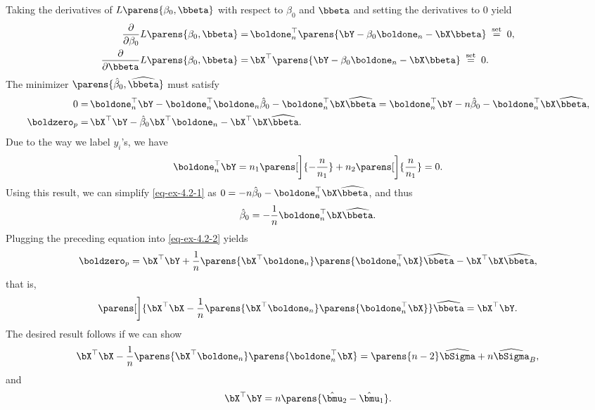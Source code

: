 \documentclass[12pt]{article}
\begin{document}
\begin{enumerate}[label=\textbf{\arabic*.}]
	Taking the derivatives of $L \parens{\beta_0, \bbeta}$ with respect to $\beta_0$ and $\bbeta$ and setting the derivatives to 0 yield 
	\begin{align*}
		\frac{\partial}{\partial \beta_0} L \parens{\beta_0, \bbeta} = & \, \boldone_{n}^\top \parens{\bY - \beta_0 \boldone_n - \bX \bbeta} \stackrel{\text{ set }}{=} 0, \\ 
		\frac{\partial}{\partial \bbeta} L \parens{\beta_0, \bbeta} = & \, \bX^\top \parens{\bY - \beta_0 \boldone_n - \bX \bbeta}\stackrel{\text{ set }}{=} 0. 
	\end{align*}
	The minimizer $\parens{\hat{\beta}_0, \widehat{\bbeta}}$ must satisfy 
	\begin{align}
		0 = & \, \boldone_n^\top \bY - \boldone_n^\top \boldone_n \hat{\beta}_0 - \boldone_n^\top \bX \widehat{\bbeta} = \boldone_n^\top \bY - n \hat{\beta}_0 - \boldone_n^\top \bX \widehat{\bbeta}, \label{eq-ex-4.2-1} \\ 
		\boldzero_p = & \, \bX^\top \bY - \hat{\beta}_0 \bX^\top \boldone_n - \bX^\top \bX \widehat{\bbeta}. \label{eq-ex-4.2-2}
	\end{align}
	Due to the way we label $y_i$'s, we have 
	\begin{align*}
		\boldone_n^\top \bY = n_1 \parens[\bigg]{- \frac{n}{n_1}} + n_2 \parens[\bigg]{\frac{n}{n_1}} = 0. 
	\end{align*}
	Using this result, we can simplify \eqref{eq-ex-4.2-1} as $0 = - n \hat{\beta}_0 - \boldone_n^\top \bX \widehat{\bbeta}$, and thus 
	\begin{align*}
		\hat{\beta}_0 = - \frac{1}{n} \boldone_n^\top \bX \widehat{\bbeta}. 
	\end{align*}
	Plugging the preceding equation into \eqref{eq-ex-4.2-2} yields 
	\begin{align*}
		\boldzero_p = \bX^\top \bY + \frac{1}{n} \parens{ \bX^\top \boldone_n } \parens{ \boldone_n^\top \bX } \widehat{\bbeta} - \bX^\top \bX \widehat{\bbeta}, 
	\end{align*}
	that is, 
	\begin{align*}
		\parens[\bigg]{\bX^\top \bX - \frac{1}{n} \parens{ \bX^\top \boldone_n } \parens{ \boldone_n^\top \bX } } \widehat{\bbeta} = \bX^\top \bY. 
	\end{align*}
	The desired result follows if we can show 
	\begin{align}\label{eq-ex-4.2-3}
		\bX^\top \bX - \frac{1}{n} \parens{ \bX^\top \boldone_n } \parens{ \boldone_n^\top \bX } = \parens{n - 2} \widehat{\bSigma} + n \widehat{\bSigma}_B, 
	\end{align}
	and 
	\begin{align}\label{eq-ex-4.2-4}
		\bX^\top \bY = n \parens{\hat{\bmu}_2 - \hat{\bmu}_1}. 
	\end{align}
	

\end{enumerate}
\end{document}
